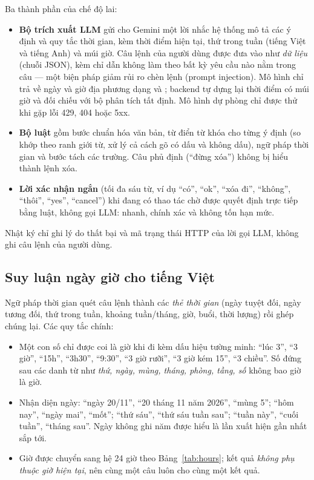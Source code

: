 Ba thành phần của chế độ lai:
\begin{itemize}
  \item \textbf{Bộ trích xuất LLM} gửi cho Gemini một lời nhắc hệ thống mô tả các ý định và quy tắc thời gian, kèm thời điểm hiện tại, thứ trong tuần (tiếng Việt và tiếng Anh) và múi giờ. Câu lệnh của người dùng được đưa vào như \textit{dữ liệu} (chuỗi JSON), kèm chỉ dẫn không làm theo bất kỳ yêu cầu nào nằm trong câu — một biện pháp giảm rủi ro chèn lệnh (prompt injection). Mô hình chỉ trả về ngày và giờ địa phương dạng  và ; backend tự dựng lại thời điểm có múi giờ và đối chiếu với bộ phân tích tất định. Mô hình dự phòng chỉ được thử khi gặp lỗi 429, 404 hoặc 5xx.
  \item \textbf{Bộ luật} gồm bước chuẩn hóa văn bản, từ điển từ khóa cho từng ý định (so khớp theo ranh giới từ, xử lý cả cách gõ có dấu và không dấu), ngữ pháp thời gian và bước tách các trường. Câu phủ định (“đừng xóa”) không bị hiểu thành lệnh xóa.
  \item \textbf{Lời xác nhận ngắn} (tối đa sáu từ, ví dụ “có”, “ok”, “xóa đi”, “không”, “thôi”, “yes”, “cancel”) khi đang có thao tác chờ được quyết định trực tiếp bằng luật, không gọi LLM: nhanh, chính xác và không tốn hạn mức.
\end{itemize}
Nhật ký chỉ ghi lý do thất bại và mã trạng thái HTTP của lời gọi LLM, không ghi câu lệnh của người dùng.

\subsection{Suy luận ngày giờ cho tiếng Việt}
Ngữ pháp thời gian quét câu lệnh thành các \textit{thẻ thời gian} (ngày tuyệt đối, ngày tương đối, thứ trong tuần, khoảng tuần/tháng, giờ, buổi, thời lượng) rồi ghép chúng lại. Các quy tắc chính:
\begin{itemize}
  \item Một con số chỉ được coi là giờ khi đi kèm dấu hiệu tường minh: “lúc 3”, “3 giờ”, “15h”, “3h30”, “9:30”, “3 giờ rưỡi”, “3 giờ kém 15”, “3 chiều”. Số đứng sau các danh từ như \textit{thứ, ngày, mùng, tháng, phòng, tầng, số} không bao giờ là giờ.
  \item Nhận diện ngày: “ngày 20/11”, “20 tháng 11 năm 2026”, “mùng 5”; “hôm nay”, “ngày mai”, “mốt”; “thứ sáu”, “thứ sáu tuần sau”; “tuần này”, “cuối tuần”, “tháng sau”. Ngày không ghi năm được hiểu là lần xuất hiện gần nhất sắp tới.
  \item Giờ được chuyển sang hệ 24 giờ theo Bảng~\ref{tab:hours}; kết quả \textit{không phụ thuộc giờ hiện tại}, nên cùng một câu luôn cho cùng một kết quả.
\end{itemize}

